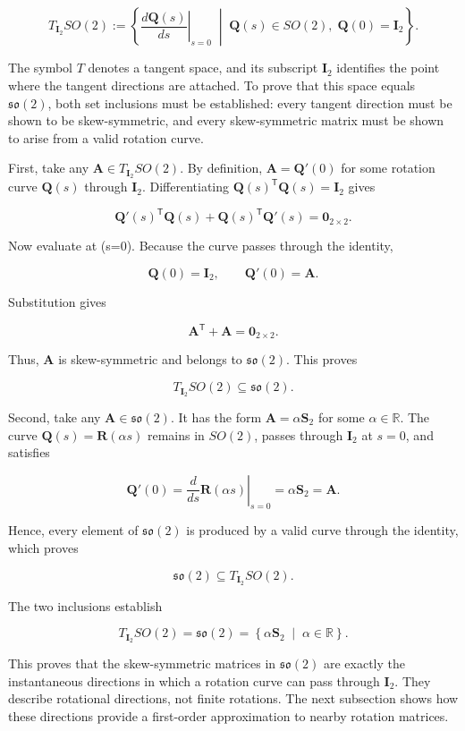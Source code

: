 \documentclass[
  australian,
  12pt,
  letterpaper,
  DIV=11,
  numbers=noendperiod,
  twoside]{scrreprt}
\begin{document}
\[
T_{\mathbf I_2}SO(2)
\mathrel{:=}
\left\{
\left.
\frac{d\mathbf Q(s)}{ds}
\right|_{s=0}
\;\middle|\;
\mathbf Q(s)\in SO(2),\;
\mathbf Q(0)=\mathbf I_2
\right\}.
\]

The symbol \(T\) denotes a tangent space, and its subscript
\(\mathbf I_2\) identifies the point where the tangent directions are
attached. To prove that this space equals \(\mathfrak{so}(2)\), both set
inclusions must be established: every tangent direction must be shown to
be skew-symmetric, and every skew-symmetric matrix must be shown to
arise from a valid rotation curve.

First, take any \(\mathbf A\in T_{\mathbf I_2}SO(2)\). By definition,
\(\mathbf A=\mathbf Q'(0)\) for some rotation curve \(\mathbf Q(s)\)
through \(\mathbf I_2\). Differentiating
\(\mathbf Q(s)^\mathsf T\mathbf Q(s)=\mathbf I_2\) gives

\[
\mathbf Q'(s)^\mathsf T\mathbf Q(s)
+
\mathbf Q(s)^\mathsf T\mathbf Q'(s)
=
\mathbf 0_{2\times2}.
\]

Now evaluate at (s=0). Because the curve passes through the identity,

\[
\mathbf Q(0)=\mathbf I_2,
\qquad
\mathbf Q'(0)=\mathbf A.
\]

Substitution gives

\[
\mathbf A^\mathsf T+\mathbf A
=
\mathbf 0_{2\times2}.
\]

Thus, \(\mathbf A\) is skew-symmetric and belongs to
\(\mathfrak{so}(2)\). This proves

\[
T_{\mathbf I_2}SO(2)
\subseteq
\mathfrak{so}(2).
\]

Second, take any \(\mathbf A\in\mathfrak{so}(2)\). It has the form
\(\mathbf A=\alpha\mathbf S_2\) for some \(\alpha\in\mathbb R\). The
curve \(\mathbf Q(s)=\mathbf R(\alpha s)\) remains in \(SO(2)\), passes
through \(\mathbf I_2\) at \(s=0\), and satisfies

\[
\mathbf Q'(0)
=
\left.
\frac{d}{ds}\mathbf R(\alpha s)
\right|_{s=0}
=
\alpha\mathbf S_2
=
\mathbf A.
\]

Hence, every element of \(\mathfrak{so}(2)\) is produced by a valid
curve through the identity, which proves

\[
\mathfrak{so}(2)
\subseteq
T_{\mathbf I_2}SO(2).
\]

The two inclusions establish

\[
\boxed{
T_{\mathbf I_2}SO(2)
=
\mathfrak{so}(2)
=
\left\{
\alpha\mathbf S_2
\;\middle|\;
\alpha\in\mathbb R
\right\}
}.
\]

This proves that the skew-symmetric matrices in \(\mathfrak{so}(2)\) are
exactly the instantaneous directions in which a rotation curve can pass
through \(\mathbf I_2\). They describe rotational directions, not finite
rotations. The next subsection shows how these directions provide a
first-order approximation to nearby rotation matrices.
\end{document}
